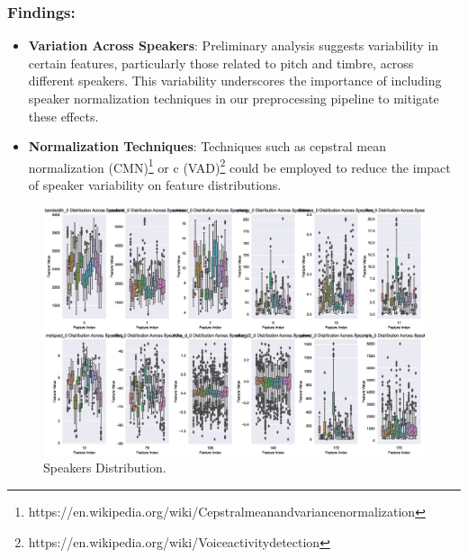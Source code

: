 \subsubsection{Findings:}

\begin{itemize}
    \item \textbf{Variation Across Speakers}: Preliminary analysis suggests variability in certain features, particularly those related to pitch and timbre, across different speakers.
    This variability underscores the importance of including speaker normalization techniques in our preprocessing pipeline to mitigate these effects.
    \item \textbf{Normalization Techniques}: Techniques such as cepstral mean normalization (CMN)\footnote{https://en.wikipedia.org/wiki/Cepstral\textunderscore mean\textunderscore and\textunderscore variance\textunderscore normalization} or c (VAD)\footnote{https://en.wikipedia.org/wiki/Voice\textunderscore activity\textunderscore detection} could be employed to reduce the impact of speaker variability on feature distributions.
\end{itemize}


\begin{figure}[!ht]
	\centering
	\includegraphics[scale=0.3]{fig/speakers_dist}
	\vspace{-0.3cm}
	\caption{Speakers Distribution.}
	\label{fig:SpeakersDistribution}
	\vspace{-0.1cm}
\end{figure}

